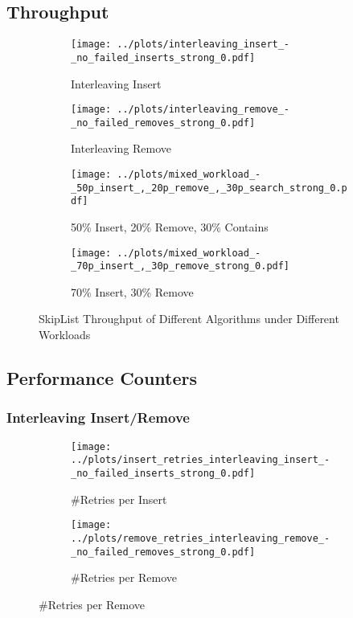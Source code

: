 \subsection{Throughput}\label{sec:throughput}

\begin{figure}[H]
    \centering
    
    \begin{subfigure}[b]{0.49\textwidth}
        \texttt{[image: ../plots/interleaving\_insert\_-\_no\_failed\_inserts\_strong\_0.pdf]}
        \caption{Interleaving Insert}
    \end{subfigure}
    \begin{subfigure}[b]{0.49\textwidth}
        \texttt{[image: ../plots/interleaving\_remove\_-\_no\_failed\_removes\_strong\_0.pdf]}
        \caption{Interleaving Remove}
    \end{subfigure}
    
    \begin{subfigure}[b]{0.49\textwidth}
        \texttt{[image: ../plots/mixed\_workload\_-\_50p\_insert\_,\_20p\_remove\_,\_30p\_search\_strong\_0.pdf]}
        \caption{50\% Insert, 20\% Remove, 30\% Contains}
    \end{subfigure}
    \begin{subfigure}[b]{0.49\textwidth}
        \texttt{[image: ../plots/mixed\_workload\_-\_70p\_insert\_,\_30p\_remove\_strong\_0.pdf]}
        \caption{70\% Insert, 30\% Remove}
    \end{subfigure}
    
    \caption{SkipList Throughput of Different Algorithms under Different Workloads}
\end{figure}


\subsection{Performance Counters}\label{sec:perf_counter}

\subsubsection*{Interleaving Insert/Remove}

\begin{figure}[H]
    \centering
    
    \begin{subfigure}[b]{0.49\textwidth}
        \texttt{[image: ../plots/insert\_retries\_interleaving\_insert\_-\_no\_failed\_inserts\_strong\_0.pdf]}
        \caption{\#Retries per Insert}
        \label{fig:insert_retries_interleaving_insert_}
    \end{subfigure}
    \begin{subfigure}[b]{0.49\textwidth}
        \texttt{[image: ../plots/remove\_retries\_interleaving\_remove\_-\_no\_failed\_removes\_strong\_0.pdf]}
        \caption{\#Retries per Remove}
        \label{fig:remove_retries_interleaving_remove_}
    \end{subfigure}
\end{figure} 


